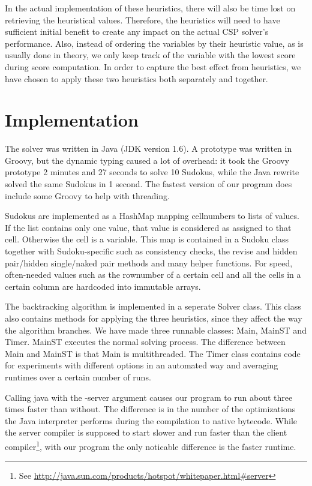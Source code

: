 \documentclass[11pt]{article} %
\begin{document}
In the actual implementation of these heuristics, there will also be time lost on retrieving the heuristical values. Therefore, the heuristics will need to have sufficient initial benefit to create any impact on the actual CSP solver's performance. Also, instead of ordering the variables by their heuristic value, as is usually done in theory, we only keep track of the variable with the lowest score during score computation. In order to capture the best effect from heuristics, we have chosen to apply these two heuristics both separately and together.

\section{Implementation}
\label{sec:impl}

The solver was written in Java (JDK version 1.6). A prototype was written in Groovy, but the dynamic typing caused a lot of overhead: it took the Groovy prototype 2 minutes and 27 seconds to solve 10 Sudokus, while the Java rewrite solved the same Sudokus in 1 second. The fastest version of our program does include some Groovy to help with threading.

Sudokus are implemented as a HashMap mapping cellnumbers to lists of values. If the list contains only one value, that value is considered as assigned to that cell. Otherwise the cell is a variable. This map is contained in a Sudoku class together with Sudoku-specific such as consistency checks, the revise and hidden pair/hidden single/naked pair methods and many helper functions. For speed, often-needed values such as the rownumber of a certain cell and all the cells in a certain column are hardcoded into immutable arrays.

The backtracking algorithm is implemented in a seperate Solver class. This class also contains methods for applying the three heuristics, since they affect the way the algorithm branches.
We have made three runnable classes: Main, MainST and Timer. MainST executes the normal solving process. The difference between Main and MainST is that Main is multithreaded. The Timer class contains code for experiments with different options in an automated way and averaging runtimes over a certain number of runs.

Calling java with the -server argument causes our program to run about three times faster than without. The difference is in the number of the optimizations the Java interpreter performs during the compilation to native bytecode. While the server compiler is supposed to start slower and run faster than the client compiler\footnote{See \url{http://java.sun.com/products/hotspot/whitepaper.html\#server}}, with our program the only noticable difference is the faster runtime.
\end{document}
